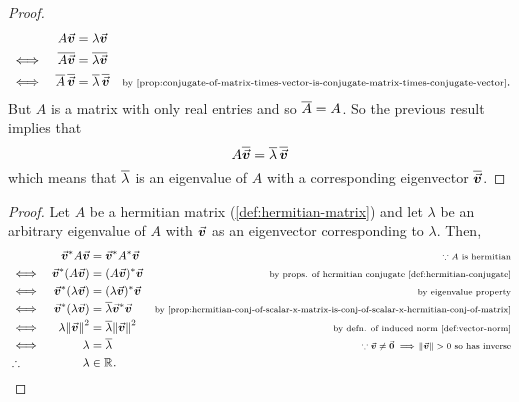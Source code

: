 \documentclass[../MathsNotesBase.tex]{subfiles}
\begin{document}
{ 	
 		\bigskip
 		\begin{proof}
 			\[\begin{aligned}
 				&& A\vec{\bm{v}} &= \lambda\vec{\bm{v}} \\
 				&\iff & \overline{A\vec{\bm{v}}} &= \overline{\lambda\vec{\bm{v}}} \\
 				&\iff & \overline{A} \, \overline{\vec{\bm{v}}} &= \overline{\lambda} \, \overline{\vec{\bm{v}}} &\text{\scriptsize{by \ref{prop:conjugate-of-matrix-times-vector-is-conjugate-matrix-times-conjugate-vector}}}.
 			\end{aligned}\]
 			But $A$ is a matrix with only real entries and so ${ \overline{A} = A }$. So the previous result implies that
 			\[ A \overline{\vec{\bm{v}}} = \overline{\lambda} \, \overline{\vec{\bm{v}}} \]
 			which means that $\overline{\lambda}$ is an eigenvalue of $A$ with a corresponding eigenvector $\overline{\vec{\bm{v}}}$. 
 		\end{proof}
 	
 		\bigskip
 		\begin{proof}
 			Let $A$ be a hermitian matrix (\ref{def:hermitian-matrix}) and let $\lambda$ be an arbitrary eigenvalue of $A$ with $\vec{\bm{v}}$ as an eigenvector corresponding to $\lambda$. Then,
 			\[\begin{aligned}
 				&& \vec{\bm{v}}^* A \vec{\bm{v}} &= \vec{\bm{v}}^* A^* \vec{\bm{v}}   &\text{\scriptsize{${ \because A }$ is hermitian}}\\
 				&\iff & \vec{\bm{v}}^* (A \vec{\bm{v}}) &= (A \vec{\bm{v}})^* \vec{\bm{v}}   &\text{\scriptsize{by props. of hermitian conjugate \ref{def:hermitian-conjugate}}} \\
 				&\iff & \vec{\bm{v}}^* (\lambda \vec{\bm{v}}) &= (\lambda \vec{\bm{v}})^* \vec{\bm{v}}   &\text{\scriptsize{by eigenvalue property}}\\
 				&\iff & \vec{\bm{v}}^* (\lambda \vec{\bm{v}}) &= \overline{\lambda} \vec{\bm{v}}^* \vec{\bm{v}}   &\text{\scriptsize{by \ref{prop:hermitian-conj-of-scalar-x-matrix-is-conj-of-scalar-x-hermitian-conj-of-matrix}}}\\
 				&\iff & \lambda \norm{\vec{\bm{v}}}^2 &= \overline{\lambda} \norm{\vec{\bm{v}}}^2   &\text{\scriptsize{by defn. of induced norm \ref{def:vector-norm}}} \\
 				&\iff & \lambda &= \overline{\lambda}   &\text{\scriptsize{${ \because \vec{\bm{v}} \neq \vec{\bm{0}} \implies \norm{\vec{\bm{v}}} > 0 }$ so has inverse}} \\
 				&\therefore & \lambda &\in \mathbb{R}^{}.  \qedhere
 			\end{aligned}\]
 		\end{proof}
 	
}
\end{document}
